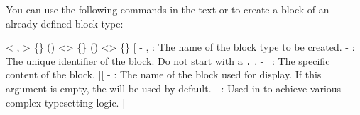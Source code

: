 
You can use the following commands in the text or  to create a block of an already defined block type:

< , >{
    \{\}
    ()
    <>
    \{\longarg\}
    \AnotherUsage
    ()
    <>
    \{\longarg\}
}[
    -  ,  : The name of the block type to be created.
    -  : The unique identifier of the block. Do not start with a \texttt{.} .
    - \longarg\ : The specific content of the block.
][
    -  : The name of the block used for display. If this argument is empty, the  will be used by default.
    -  : Used in  to achieve various complex typesetting logic.
]

\AutomaticListoff

